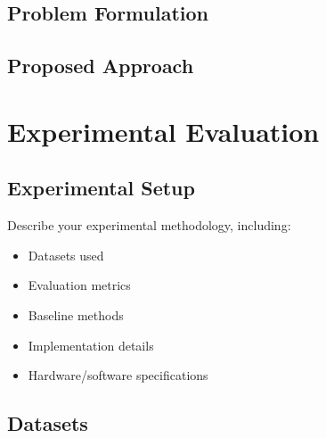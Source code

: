 \documentclass[11pt,a4paper]{article}
\begin{document}

\subsection{Problem Formulation}
\label{subsec:formulation}


\subsection{Proposed Approach}
\label{subsec:approach}


\section{Experimental Evaluation}
\label{sec:experiments}


\subsection{Experimental Setup}
\label{subsec:setup}

Describe your experimental methodology, including:
\begin{itemize}
    \item Datasets used
    \item Evaluation metrics
    \item Baseline methods
    \item Implementation details
    \item Hardware/software specifications
\end{itemize}

\subsection{Datasets}
\label{subsec:datasets}
\end{document}
